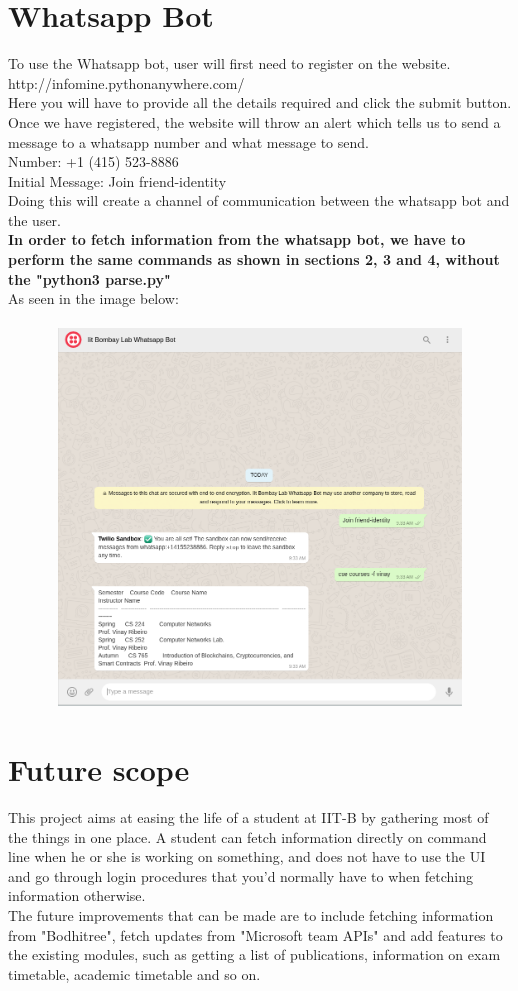 \documentclass[12pt, letterpaper, twoside]{article}
\begin{document}
\section{Whatsapp Bot}

To use the Whatsapp bot, user will first need to register on the website.\\
http://infomine.pythonanywhere.com/ \\
Here you will have to provide all the details required and click the submit button. Once we have registered, the website will throw an alert which tells us to send a message to a whatsapp number and what message to send.\\
Number: +1 (415) 523-8886 \\
Initial Message: Join friend-identity \\
Doing this will create a channel of communication between the whatsapp bot and the user. \\
\textbf{In order to fetch information from the whatsapp bot, we have to perform the same commands as shown in sections 2, 3 and 4, without the "python3 parse.py"}\\
As seen in the image below: \\
\\
\includegraphics[width=14cm, height=10cm]{whatsappbot}

\section{Future scope}
This project aims at easing the life of a student at IIT-B by gathering most of the things in one place. A student can fetch information directly on command line when he or she is working on something, and does not have to use the UI and go through login procedures that you'd normally have to when fetching information otherwise.\\
The future improvements that can be made are to include fetching information from "Bodhitree", fetch updates from "Microsoft team APIs" and add features to the existing modules, such as getting a list of publications, information on exam timetable, academic timetable and so on.
\end{document}
